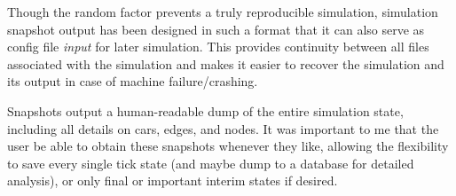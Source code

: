 \par Though the random factor prevents a truly reproducible simulation, simulation snapshot output has been designed in such a format that it can also serve as config file \textit{input} for later simulation.  This provides continuity between all files associated with the simulation and makes it easier to recover the simulation and its output in case of machine failure/crashing. \\

\par Snapshots output a human-readable dump of the entire simulation state, including all details on cars, edges, and nodes.  It was important to me that the user be able to obtain these snapshots whenever they like, allowing the flexibility to save every single tick state (and maybe dump to a database for detailed analysis), or only final or important interim states if desired.